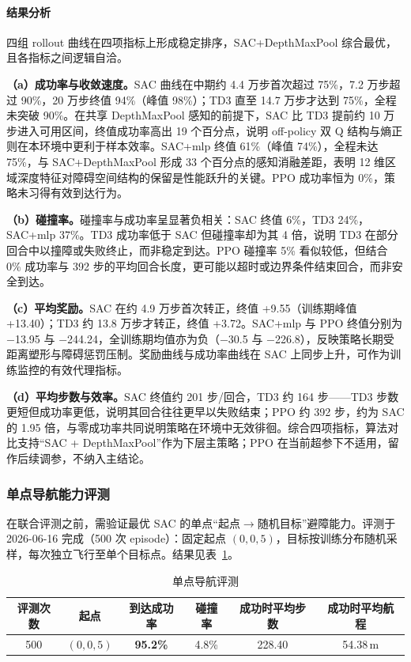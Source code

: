 \paragraph{结果分析}
四组 rollout 曲线在四项指标上形成稳定排序，SAC+DepthMaxPool 综合最优，且各指标之间逻辑自洽。

\textbf{（a）成功率与收敛速度。}SAC 曲线在中期约 4.4 万步首次超过 75\%，7.2 万步超过 90\%，20 万步终值 94\%（峰值 98\%）；TD3 直至 14.7 万步才达到 75\%，全程未突破 90\%。在共享 DepthMaxPool 感知的前提下，SAC 比 TD3 提前约 10 万步进入可用区间，终值成功率高出 19 个百分点，说明 off-policy 双 Q 结构与熵正则在本环境中更利于样本效率。SAC+mlp 终值 61\%（峰值 74\%），全程未达 75\%，与 SAC+DepthMaxPool 形成 33 个百分点的感知消融差距，表明 12 维区域深度特征对障碍空间结构的保留是性能跃升的关键。PPO 成功率恒为 0\%，策略未习得有效到达行为。

\textbf{（b）碰撞率。}碰撞率与成功率呈显著负相关：SAC 终值 6\%，TD3 24\%，SAC+mlp 37\%。TD3 成功率低于 SAC 但碰撞率却为其 4 倍，说明 TD3 在部分回合中以撞障或失败终止，而非稳定到达。PPO 碰撞率 5\% 看似较低，但结合 0\% 成功率与 392 步的平均回合长度，更可能以超时或边界条件结束回合，而非安全到达。

\textbf{（c）平均奖励。}SAC 在约 4.9 万步首次转正，终值 +9.55（训练期峰值 +13.40）；TD3 约 13.8 万步才转正，终值 +3.72。SAC+mlp 与 PPO 终值分别为 $-$13.95 与 $-$244.24，全训练期均值亦为负（$-$30.5 与 $-$226.8），反映策略长期受距离塑形与障碍惩罚压制。奖励曲线与成功率曲线在 SAC 上同步上升，可作为训练监控的有效代理指标。

\textbf{（d）平均步数与效率。}SAC 终值约 201 步/回合，TD3 约 164 步——TD3 步数更短但成功率更低，说明其回合往往更早以失败结束；PPO 约 392 步，约为 SAC 的 1.95 倍，与零成功率共同说明策略在环境中无效徘徊。综合四项指标，算法对比支持``SAC + DepthMaxPool''作为下层主策略；PPO 在当前超参下不适用，留作后续调参，不纳入主结论。

\subsubsection{单点导航能力评测}

在联合评测之前，需验证最优 SAC 的单点``起点$\to$随机目标''避障能力。评测于 2026-06-16 完成（500 次 episode）：固定起点 $(0,0,5)$，目标按训练分布随机采样，每次独立飞行至单个目标点。结果见表~\ref{tab:nav-single}。

\begin{table}[htbp]
  \centering
  \caption{单点导航评测}
  \label{tab:nav-single}
  \begin{tabular}{cccccc}
    \toprule
    评测次数 & 起点 & 到达成功率 & 碰撞率 & 成功时平均步数 & 成功时平均航程 \\
    \midrule
    500 & $(0,0,5)$ & \textbf{95.2\%} & 4.8\% & 228.40 & 54.38\,m \\
    \bottomrule
  \end{tabular}

\end{table}

